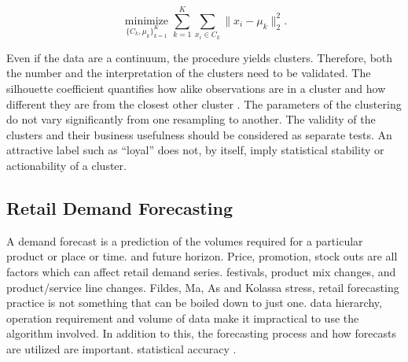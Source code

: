 \documentclass[a4paper,11pt,oneside]{book}
\theoremstyle{plain}
\theoremstyle{definition}
\theoremstyle{remark}
\begin{document}
\begin{equation}
  \underset{\{C_k,\mu_k\}_{k=1}^{K}}{\operatorname{minimize}}
  \sum_{k=1}^{K}\sum_{x_i\in C_k}\lVert x_i-\mu_k\rVert_2^2.
  \label{eq:kmeans}
\end{equation}

Even if the data are a continuum, the procedure yields clusters. Therefore, both the number and the interpretation of the clusters need to be validated. The silhouette coefficient quantifies how alike observations are in a cluster and how different they are from the closest other cluster \cite{rousseeuw1987silhouettes}. The parameters of the clustering do not vary significantly from one resampling to another. The validity of the clusters and their business usefulness should be considered as separate tests. An attractive label such as “loyal” does not, by itself, imply statistical stability or actionability of a cluster.

\subsection{Retail Demand Forecasting}

A demand forecast is a prediction of the volumes required for a particular product or place or time. and future horizon. Price, promotion, stock outs are all factors which can affect retail demand series. festivals, product mix changes, and product/service line changes. Fildes, Ma, As and Kolassa stress, retail forecasting practice is not something that can be boiled down to just one. data hierarchy, operation requirement and volume of data make it impractical to use the algorithm involved. In addition to this, the forecasting process and how forecasts are utilized are important. statistical accuracy \cite{fildes2022retail}.
\end{document}
